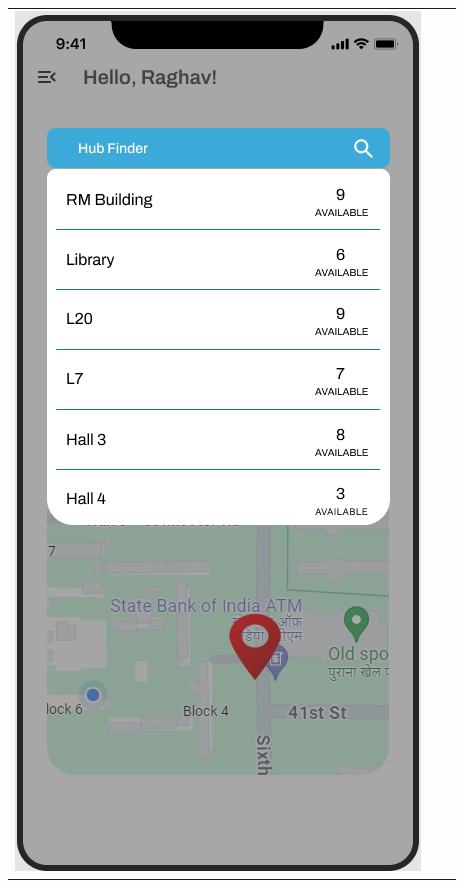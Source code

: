 \begin{center}
\begin{tabular}{ccc}
    \includegraphics[scale=0.35]{ui-images/HubSelection.png} &

\end{tabular}
\end{center}
